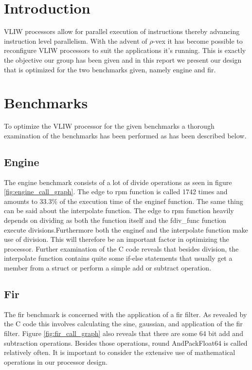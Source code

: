 \section{Introduction}
VLIW processors allow for parallel execution of instructions thereby advancing instruction level parallelism. With the advent of $\rho$-vex it has become possible to reconfigure VLIW processors to suit the applications it's running. This is exactly the objective our group has been given and in this report we present our design that is optimized for the two benchmarks given, namely engine and fir.

\section{Benchmarks}
To optimize the VLIW processor for the given benchmarks a thorough examination of the benchmarks has been performed as has been described below.

\subsection{Engine}
The engine benchmark consists of a lot of divide operations as seen in figure \ref{fig:engine_call_graph}. The edge to rpm function is called 1742 times and amounts to 33.3\% of the execution time of the enginef function. The same thing can be said about the interpolate function. The edge to rpm function heavily depends on dividing as both the function itself and the fdiv\_func function execute divisions.Furthermore both the enginef and the interpolate function make use of division. This will therefore be an important factor in optimizing the processor. Further examination of the C code reveals that besides division, the interpolate function contains quite some if-else statements that usually get a member from a struct or perform a simple add or subtract operation.

\subsection{Fir}
The fir benchmark is concerned with the application of a fir filter. As revealed by the C code this involves calculating the sine, gaussian, and application of the fir filter. Figure \ref{fig:fir_call_graph} also reveals that there are some 64 bit add and subtraction operations. Besides those operations, round AndPackFloat64 is called relatively often. It is important to consider the extensive use of mathematical operations in our processor design.

